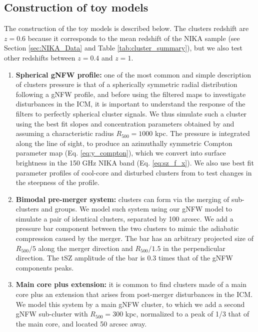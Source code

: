 \documentclass[twocolumn,traditabstract]{aa}
\begin{document}
\subsection{Construction of toy models}
The construction of the toy models is described below. The clusters redshift are $z=0.6$ because it corresponds to the mean redshift of the NIKA sample (see Section \ref{sec:NIKA_Data} and Table \ref{tab:cluster_summary}), but we also test other redshifts between $z=0.4$ and $z=1$.
\begin{enumerate}
\item {\bf Spherical gNFW profile:} one of the most common and simple description of clusters pressure is that of a spherically symmetric radial distribution following a gNFW \citep{Nagai2007} profile, and before using the filtered maps to investigate disturbances in the ICM, it is important to understand the response of the filters to perfectly spherical cluster signals. We thus simulate such a cluster using the best fit slopes and concentration parameters obtained by \cite{Planck2013V} and assuming a characteristic radius $R_{500} = 1000$ kpc. The pressure is integrated along the line of sight, to produce an azimuthally symmetric Compton parameter map (Eq. \ref{eq:y_compton}), which we convert into surface brightness in the 150 GHz NIKA band (Eq. \ref{eq:sz_f_x}). We also use best fit parameter profiles of cool-core and disturbed clusters from \cite{Arnaud2010} to test changes in the steepness of the profile.
\item {\bf Bimodal pre-merger system:} clusters can form via the merging of sub-clusters and groups. We model such system using our gNFW model to simulate a pair of identical clusters, separated by 100 arcsec. We add a pressure bar component between the two clusters to mimic the adiabatic compression caused by the merger. The bar has an arbitrary projected size of $R_{500}/5$ along the merger direction and $R_{500}/1.5$ in the perpendicular direction. The tSZ amplitude of the bar is 0.3 times that of the gNFW components peaks.
\item {\bf Main core plus extension:} it is common to find clusters made of a main core plus an extension that arises from post-merger disturbances in the ICM. We model this system by a main gNFW cluster, to which we add a second gNFW sub-cluster with $R_{500} = 300$ kpc, normalized to a peak of 1/3 that of the main core, and located 50 arcsec away.

\end{enumerate}
\end{document}

